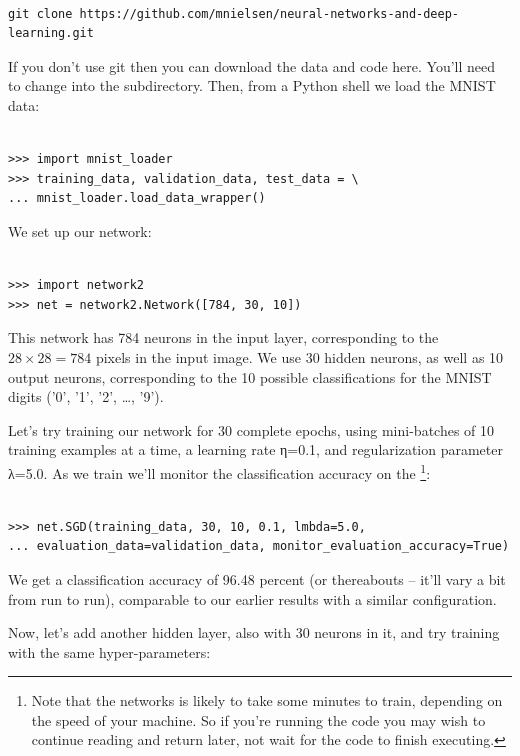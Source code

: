 \documentclass[a4paper,twoside,10pt]{book}
\begin{document}
\begin{lstlisting}

git clone https://github.com/mnielsen/neural-networks-and-deep-learning.git

\end{lstlisting}
If you don't use git then you can download the data and code here. You'll need to change into the  subdirectory.
Then, from a Python shell we load the MNIST data:

\begin{lstlisting}

>>> import mnist_loader
>>> training_data, validation_data, test_data = \
... mnist_loader.load_data_wrapper()

\end{lstlisting}
We set up our network:

\begin{lstlisting}

>>> import network2
>>> net = network2.Network([784, 30, 10])

\end{lstlisting}
This network has 784 neurons in the input layer, corresponding to the $28\times28=784$ pixels in the input image. We use 30 hidden neurons, as well as 10 output neurons, corresponding to the 10 possible classifications for the MNIST digits ('0', '1', '2', …, '9').

Let's try training our network for 30 complete epochs, using mini-batches of 10 training examples at a time, a learning rate η=0.1, and regularization parameter λ=5.0. As we train we'll monitor the classification accuracy on the \footnote{Note that the networks is likely to take some minutes to train, depending on the speed of your machine. So if you're running the code you may wish to continue reading and return later, not wait for the code to finish executing.}:
\begin{lstlisting}

>>> net.SGD(training_data, 30, 10, 0.1, lmbda=5.0, 
... evaluation_data=validation_data, monitor_evaluation_accuracy=True)

\end{lstlisting}
We get a classification accuracy of 96.48 percent (or thereabouts -- it'll vary a bit from run to run), comparable to our earlier results with a similar configuration.

Now, let's add another hidden layer, also with 30 neurons in it, and try training with the same hyper-parameters:
\end{document}
